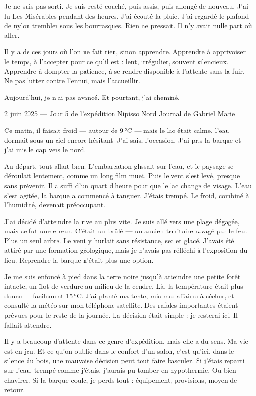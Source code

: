 Je ne suis pas sorti. Je suis resté couché, puis assis, puis allongé de nouveau. J’ai lu Les Misérables pendant des heures. J’ai écouté la pluie. J’ai regardé le plafond de nylon trembler sous les bourrasques. Rien ne pressait. Il n’y avait nulle part où aller.

Il y a de ces jours où l’on ne fait rien, sinon apprendre. Apprendre à apprivoiser le temps, à l’accepter pour ce qu’il est : lent, irrégulier, souvent silencieux. Apprendre à dompter la patience, à se rendre disponible à l’attente sans la fuir. Ne pas lutter contre l’ennui, mais l’accueillir.

Aujourd’hui, je n’ai pas avancé. Et pourtant, j’ai cheminé.





2 juin 2025 — Jour 5 de l’expédition Nipisso Nord
Journal de Gabriel Marie

Ce matin, il faisait froid — autour de 9 °C — mais le lac était calme, l’eau dormait sous un ciel encore hésitant. J’ai saisi l’occasion. J’ai pris la barque et j’ai mis le cap vers le nord.

Au départ, tout allait bien. L’embarcation glissait sur l’eau, et le paysage se déroulait lentement, comme un long film muet. Puis le vent s’est levé, presque sans prévenir. Il a suffi d’un quart d’heure pour que le lac change de visage. L’eau s’est agitée, la barque a commencé à tanguer. J’étais trempé. Le froid, combiné à l’humidité, devenait préoccupant.

J’ai décidé d’atteindre la rive au plus vite. Je suis allé vers une plage dégagée, mais ce fut une erreur. C’était un brûlé — un ancien territoire ravagé par le feu. Plus un seul arbre. Le vent y hurlait sans résistance, sec et glacé. J’avais été attiré par une formation géologique, mais je n’avais pas réfléchi à l’exposition du lieu. Reprendre la barque n’était plus une option.

Je me suis enfoncé à pied dans la terre noire jusqu’à atteindre une petite forêt intacte, un îlot de verdure au milieu de la cendre. Là, la température était plus douce — facilement 15 °C. J’ai planté ma tente, mis mes affaires à sécher, et consulté la météo sur mon téléphone satellite. Des rafales importantes étaient prévues pour le reste de la journée. La décision était simple : je resterai ici. Il fallait attendre.

Il y a beaucoup d’attente dans ce genre d’expédition, mais elle a du sens. Ma vie est en jeu. Et ce qu’on oublie dans le confort d’un salon, c’est qu’ici, dans le silence du bois, une mauvaise décision peut tout faire basculer. Si j’étais reparti sur l’eau, trempé comme j’étais, j’aurais pu tomber en hypothermie. Ou bien chavirer. Si la barque coule, je perds tout : équipement, provisions, moyen de retour.

